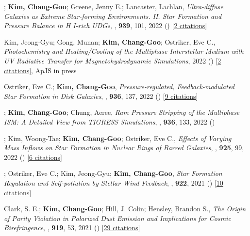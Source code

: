 \item[{28.}]; \textbf{Kim, Chang-Goo}; Greene, Jenny E.; Lancaster, Lachlan, \textit{Ultra-diffuse Galaxies as Extreme Star-forming Environments. II. Star Formation and Pressure Balance in H I-rich UDGs}, , \textbf{939}, 101, 2022 () [\href{http://adsabs.harvard.edu/abs/2022ApJ...939..101K}{2 citations}]

\item[{27.}]Kim, Jeong-Gyu; Gong, Munan; \textbf{Kim, Chang-Goo}; Ostriker, Eve C., \textit{Photochemistry and Heating/Cooling of the Multiphase Interstellar Medium with UV Radiative Transfer for Magnetohydrodynamic Simulations}, 2022 () [\href{http://adsabs.harvard.edu/abs/2022arXiv221008024K}{2 citations}], ApJS in press

\item[{26.}]Ostriker, Eve C.; \textbf{Kim, Chang-Goo}, \textit{Pressure-regulated, Feedback-modulated Star Formation in Disk Galaxies}, , \textbf{936}, 137, 2022 () [\href{http://adsabs.harvard.edu/abs/2022ApJ...936..137O}{9 citations}]

\item[{25.}]; \textbf{Kim, Chang-Goo}; Chung, Aeree, \textit{Ram Pressure Stripping of the Multiphase ISM: A Detailed View from TIGRESS Simulations}, , \textbf{936}, 133, 2022 ()

\item[{24.}]; Kim, Woong-Tae; \textbf{Kim, Chang-Goo}; Ostriker, Eve C., \textit{Effects of Varying Mass Inflows on Star Formation in Nuclear Rings of Barred Galaxies}, , \textbf{925}, 99, 2022 () [\href{http://adsabs.harvard.edu/abs/2022ApJ...925...99M}{6 citations}]

\item[{23.}]; Ostriker, Eve C.; Kim, Jeong-Gyu; \textbf{Kim, Chang-Goo}, \textit{Star Formation Regulation and Self-pollution by Stellar Wind Feedback}, , \textbf{922}, 2021 () [\href{http://adsabs.harvard.edu/abs/2021ApJ...922L...3L}{10 citations}]

\item[{22.}]Clark, S. E.; \textbf{Kim, Chang-Goo}; Hill, J. Colin; Hensley, Brandon S., \textit{The Origin of Parity Violation in Polarized Dust Emission and Implications for Cosmic Birefringence}, , \textbf{919}, 53, 2021 () [\href{http://adsabs.harvard.edu/abs/2021ApJ...919...53C}{29 citations}]

